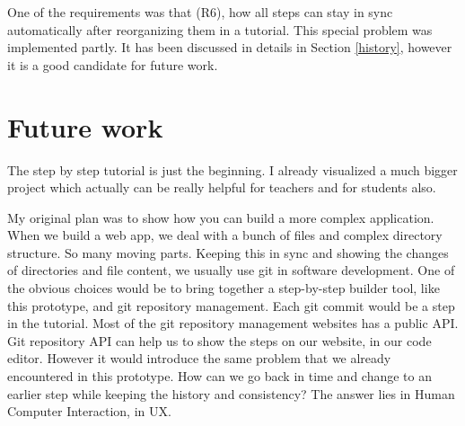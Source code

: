 \documentclass[11pt, a4paper, oneside, openright, medskipamount]{report}
\begin{document}
One of the requirements was that (R6), how all steps can stay in sync automatically after reorganizing them in a tutorial. This special problem was implemented partly. It has been discussed in details in Section \ref{history}, however it is a good candidate for future work.

\section{Future work}

The step by step tutorial is just the beginning. I already visualized a much bigger project which actually can be really helpful for teachers and for students also.

My original plan was to show how you can build a more complex application. When we build a web app, we deal with a bunch of files and complex directory structure. So many moving parts. Keeping this in sync and showing the changes of directories and file content, we usually use git in software development. One of the obvious choices would be to bring together a step-by-step builder tool, like this prototype, and git repository management. Each git commit would be a step in the tutorial. Most of the git repository management websites has a public API. Git repository API can help us to show the steps on our website, in our code editor. However it would introduce the same problem that we already encountered in this prototype. How can we go back in time and change to an earlier step while keeping the history and consistency? The answer lies in Human Computer Interaction, in UX.



\backmatter



\end{document}
